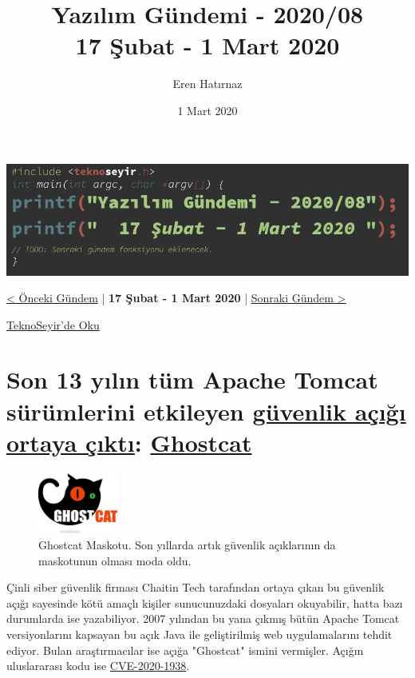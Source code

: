 \documentclass[11pt]{article}
\author{Eren Hatırnaz}
\date{1 Mart 2020}
\title{Yazılım Gündemi - 2020/08\\\medskip
\large 17 Şubat - 1 Mart 2020}
\begin{document}
\maketitle
\tableofcontents \clearpage\shorthandoff{=}

\begin{center}
\includegraphics[width=.9\linewidth]{gorseller/yazilim-gundemi-banner.png}
\end{center}

\begin{center}
\href{../07/yazilim-gundemi-2020-07.pdf}{< Önceki Gündem} | \textbf{17 Şubat - 1 Mart 2020} | \href{../09/yazilim-gundemi-2020-09.pdf}{Sonraki Gündem >}

\href{https://teknoseyir.com/blog/yazilim-gundemi-2020-08}{TeknoSeyir'de Oku}
\end{center}

\section{Son 13 yılın tüm Apache Tomcat sürümlerini etkileyen \href{https://www.zdnet.com/article/ghostcat-bug-impacts-all-apache-tomcat-versions-released-in-the-last-13-years/}{güvenlik açığı ortaya çıktı}: \href{https://www.chaitin.cn/en/ghostcat}{Ghostcat}}
\label{sec:orgd7bb6ef}
\begin{figure}[htbp]
\centering
\includegraphics[height=2cm]{gorseller/ghostcat.png}
\caption{Ghostcat Maskotu. Son yıllarda artık güvenlik açıklarının da maskotunun olması moda oldu.}
\end{figure}

Çinli siber güvenlik firması Chaitin Tech tarafından ortaya çıkan bu güvenlik
açığı sayesinde kötü amaçlı kişiler sunucunuzdaki dosyaları okuyabilir, hatta
bazı durumlarda ise yazabiliyor. 2007 yılından bu yana çıkmış bütün Apache
Tomcat versiyonlarını kapsayan bu açık Java ile geliştirilmiş web
uygulamalarını tehdit ediyor. Bulan araştırmacılar ise açığa "Ghostcat" ismini
vermişler. Açığın uluslararası kodu ise \href{http://cve.mitre.org/cgi-bin/cvename.cgi?name=CVE-2020-1938}{CVE-2020-1938}.
\end{document}
